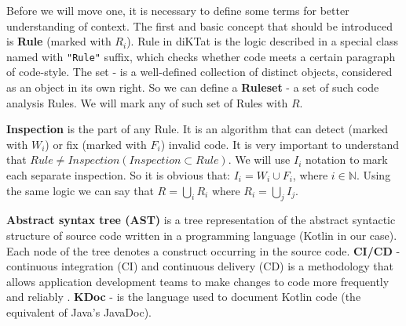 Before we will move one, it is necessary to define some terms for better understanding of context.
The first and basic concept that should be introduced is \textbf{Rule} (marked with $R_i$). Rule in diKTat is the logic described in a special class named with \texttt{"Rule"} suffix, which checks whether code meets a certain paragraph of code-style. The set - is a well-defined collection of distinct objects, considered as an object in its own right. So we can define a \textbf{Ruleset} - a set of such code analysis Rules. We will mark any of such set of Rules with $R$.

\textbf{Inspection} is the part of any Rule. It is an algorithm that can detect (marked with $W_i$) or fix (marked with $F_i$) invalid code. It is very important to understand that $Rule \neq Inspection (Inspection \subset Rule)$. We will use $I_i$ notation to mark each separate inspection. So it is obvious that: $I_i = W_i \cup F_i$, where $i \in \mathbb {N}$. Using the same logic we can say that $R = \bigcup\limits_{i} R_i$ where $R_i = \bigcup\limits_{j} I_j$.

\textbf{Abstract syntax tree (AST)} is a tree representation of the abstract syntactic structure of source code written in a programming language (Kotlin in our case). Each node of the tree denotes a construct occurring in the source code. \textbf{CI/CD} - continuous integration (CI) and continuous delivery (CD) is a methodology that allows application development teams to make changes to code more frequently and reliably \cite{ref:cicd}. \textbf{KDoc} - is the language used to document Kotlin code (the equivalent of Java's JavaDoc).